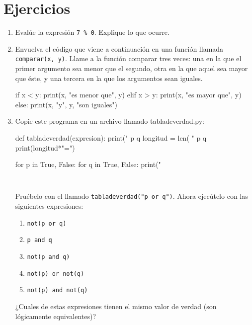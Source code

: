 \section{Ejercicios}
\begin{enumerate}
\item Evalúe la expresión \verb+7 % 0+. Explique lo que ocurre.
\item Envuelva el código que viene a continuación en una función llamada
\verb+comparar(x, y)+. Llame a la función comparar tres veces: una
en la que el primer argumento sea menor que el segundo, otra en la
que aquel sea mayor que éste, y una tercera en la que los argumentos
sean iguales. 
\begin{pythoncode}
 if x < y:
    print(x, "es menor que", y)
 elif x > y:
    print(x, "es mayor que", y)
 else:
    print(x, "y", y, "son iguales")
\end{pythoncode}
\item Copie este programa en un archivo llamado tabladeverdad.py: 
\begin{pythoncode}
def tabladeverdad(expresion):
    print(" p      q      %
    longitud = len( " p      q      %
    print(longitud*"=")

    for p in True, False:
        for q in True, False:
            print("%
\end{pythoncode}

\begin{verbatim}
 
\end{verbatim}
Pruébelo con el llamado \verb+tabladeverdad("p or q")+. Ahora ejecútelo
con las siguientes expresiones: 
\begin{enumerate}
\item \texttt{\textquotedbl{}not(p or q)\textquotedbl{}} 
\item \texttt{\textquotedbl{}p and q\textquotedbl{}} 
\item \texttt{\textquotedbl{}not(p and q)\textquotedbl{}} 
\item \texttt{\textquotedbl{}not(p) or not(q)\textquotedbl{}} 
\item \texttt{\textquotedbl{}not(p) and not(q)\textquotedbl{} }
\end{enumerate}
¿Cuales de estas expresiones tienen el mismo valor de verdad (son
lógicamente equivalentes)?
\end{enumerate}

